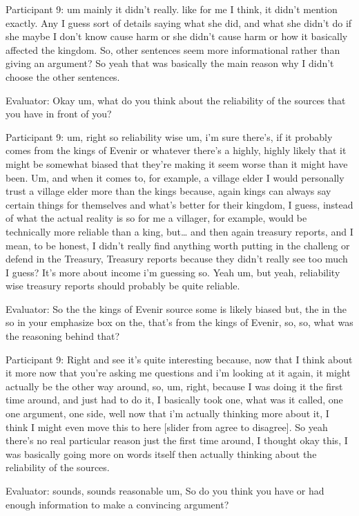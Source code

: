 \documentclass{l4proj}
\begin{document}
\begin{appendices}
Participant 9: um mainly it didn't really. like for me I think, it didn't mention exactly. Any I guess sort of details saying what she did, and what she didn't do if she maybe I don't know cause harm or she didn't cause harm or how it basically affected the kingdom. So, other sentences seem more informational rather than giving an argument? So yeah that was basically the main reason why I didn't choose the other sentences.

Evaluator: Okay um, what do you think about the reliability of the sources that you have in front of you?

Participant 9: um, right so reliability wise um, i'm sure there's, if it probably comes from the kings of Evenir or whatever there's a highly, highly likely that it might be somewhat biased that they're making it seem worse than it might have been. Um, and when it comes to, for example, a village elder I would personally trust a village elder more than the kings because, again kings can always say certain things for themselves and what's better for their kingdom, I guess, instead of what the actual reality is so for me a villager, for example, would be technically more reliable than a king, but… and then again treasury reports, and I mean, to be honest, I didn't really find anything worth putting in the challeng or defend in the Treasury,  Treasury reports because they didn't really see too much I guess? It's more about income i'm guessing so. Yeah um, but yeah,  reliability wise treasury reports should probably be quite reliable.

Evaluator: So the the kings of Evenir source some is likely biased but, the in the so in your emphasize box on the, that's from the kings of Evenir, so, so, what was the reasoning behind that?

Participant 9: Right and see it's quite interesting because, now that I think about it more now that you're asking me questions and i'm looking at it again, it might actually be the other way around, so, um, right, because I was doing it the first time around, and just had to do it, I basically took one, what was it called, one one argument, one side, well now that i'm actually thinking more about it, I think I might even move this to here [slider from agree to disagree]. So yeah there's no real particular reason just the first time around, I thought okay this, I was basically going more on words itself then actually thinking about the reliability of the sources.

Evaluator: sounds, sounds reasonable um, So do you think you have or had enough information to make a convincing argument?


\end{appendices}
\end{document}

